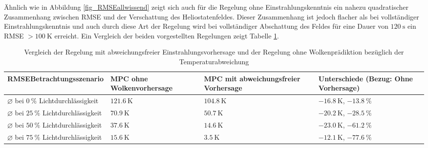 Ähnlich wie in Abbildung \ref{fig_RMSEallwissend} zeigt sich auch für die Regelung ohne Einstrahlungskenntnis ein nahezu quadratischer Zusammenhang zwischen RMSE und der Verschattung des Heliostatenfeldes.
Dieser Zusammenhang ist jedoch flacher als bei vollständiger Einstrahlungskenntnis und auch durch diese Art der Regelung wird bei vollständiger Abschattung des Feldes für eine Dauer von $\SI{120}{\second}$ ein RMSE $>\SI{100}{\kelvin}$ erreicht.
Ein Vergleich der beiden vorgestellten Regelungen zeigt Tabelle \ref{tab_Vergleich2}.

\begingroup
\renewcommand{\arraystretch}{1.2}
\begin{table}[ht!]
\caption[Vergleich der Regelung mit abweichungsfreier Einstrahlungsvorhersage und der Regelung ohne Wolkenprädiktion bezüglich der Temperaturabweichung]{Vergleich der Regelung mit abweichungsfreier Einstrahlungsvorhersage und der Regelung ohne Wolkenprädiktion bezüglich der Temperaturabweichung}
    \centering
    \begin{tabular}{>{\centering\arraybackslash}m{}>{\centering\arraybackslash}m{}>{\centering\arraybackslash}m{}>{\centering\arraybackslash}m{}}
        \rowcolor{white}
        \toprule
        RMSE\linebreak Betrachtungsszenario                      & MPC ohne Wolkenvorhersage & MPC mit abweichungsfreier Vorhersage & Unterschiede (Bezug: Ohne Vorhersage)         \\
        \midrule
        $\diameter$ bei $\SI{0}{\percent}$ Lichtdurchlässigkeit  & $\SI{121.6}{\kelvin}$     & $\SI{104.8}{\kelvin}$                & $\SI{-16.8}{\kelvin}$, $\SI{-13.8}{\percent}$ \\
        $\diameter$ bei $\SI{25}{\percent}$ Lichtdurchlässigkeit & $\SI{70.9}{\kelvin}$      & $\SI{50.7}{\kelvin}$                 & $\SI{-20.2}{\kelvin}$, $\SI{-28.5}{\percent}$ \\
        $\diameter$ bei $\SI{50}{\percent}$ Lichtdurchlässigkeit & $\SI{37.6}{\kelvin}$      & $\SI{14.6}{\kelvin}$                 & $\SI{-23.0}{\kelvin}$, $\SI{-61.2}{\percent}$ \\
        $\diameter$ bei $\SI{75}{\percent}$ Lichtdurchlässigkeit & $\SI{15.6}{\kelvin}$      & $\SI{3.5}{\kelvin}$                  & $\SI{-12.1}{\kelvin}$, $\SI{-77.6}{\percent}$ \\
        \toprule
    \end{tabular}
    \label{tab_Vergleich2}
\end{table}
\endgroup

